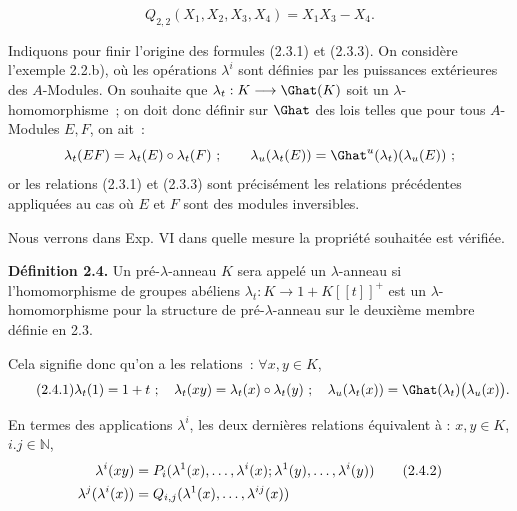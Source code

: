\[
  Q_{2,2}(X_1,X_2,X_3,X_4)=X_1X_3-X_4.
\]

Indiquons pour finir l'origine des formules (2.3.1) et (2.3.3). On considère l'exemple 2.2.b), où les opérations \(\lambda^i\) sont définies par les puissances extérieures des \(A\)-Modules. On souhaite que \(\lambda_t:K\longrightarrow\Ghat(K)\) soit un \(\lambda\)-homomorphisme~; on doit donc définir sur \(\Ghat\) des lois telles que pour tous \(A\)-Modules \(E,F\), on ait~:
\[
  \lambda_t(EF)=\lambda_t(E)\circ\lambda_t(F)~;\qquad
  \lambda_u(\lambda_t(E))=\Ghat^u(\lambda_t)(\lambda_u(E))~;
\]
or les relations (2.3.1) et (2.3.3) sont précisément les relations précédentes appliquées au cas où \(E\) et \(F\) sont des modules inversibles.

Nous verrons dans Exp. VI dans quelle mesure la propriété souhaitée est vérifiée.

\textbf{Définition 2.4.} Un pré-\(\lambda\)-anneau \(K\) sera appelé un \(\lambda\)-anneau si l'homomorphisme de groupes abéliens \(\lambda_t:K\longrightarrow1+K[[t]]^+\) est un \(\lambda\)-homomorphisme pour la structure de pré-\(\lambda\)-anneau sur le deuxième membre définie en 2.3.

Cela signifie donc qu'on a les relations~: \(\forall x,y\in K\),
\begin{equation}\tag{2.4.1}
  \lambda_t(1)=1+t~;\quad
  \lambda_t(xy)=\lambda_t(x)\circ\lambda_t(y)~;\quad
  \lambda_u(\lambda_t(x))=\Ghat(\lambda_t)\bigl(\lambda_u(x)\bigr).
\end{equation}

En termes des applications \(\lambda^i\), les deux dernières relations équivalent à : \(x,y\in K\), \(i.j\in\mathbb N\),
\begin{align}
  \lambda^i(xy)
  &=P_i(\lambda^1(x),\ldots,\lambda^i(x);
       \lambda^1(y),\ldots,\lambda^i(y)) \tag{2.4.2}\\
  \lambda^j(\lambda^i(x))
  &=Q_{i,j}(\lambda^1(x),\ldots,\lambda^{ij}(x)) \notag
\end{align}


